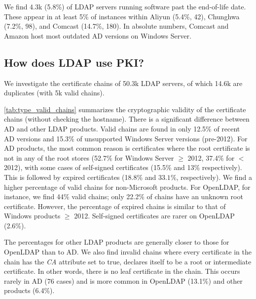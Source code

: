 We find 4.3k (5.8\%) of \gls{LDAP} servers running software past the end-of-life date. These appear in at least 5\% of instances within Aliyun (5.4\%, 42), Chunghwa (7.2\%, 98), and Comcast (14.7\%, 180). In absolute numbers, Comcast and Amazon host most outdated \gls{AD} versions on Windows Server.

\subsection{How does LDAP use PKI?}
We investigate the certificate chains of 50.3k \gls{LDAP} servers, of which 14.6k are duplicates (with 5k valid chains). %


\cref{tab:type_valid_chains} summarizes the cryptographic validity of the certificate chains (without checking the hostname). There is a significant difference between \gls{AD} and other \gls{LDAP} products. Valid chains are found in only 12.5\% of recent \gls{AD} versions and 15.3\% of unsupported Windows Server versions (pre-2012). 
For \gls{AD} products, the most common reason is certificates where the root certificate is not in any of the root stores (52.7\% for Windows Server $\geq$ 2012, 37.4\% for $<$ 2012), with some cases of self-signed certificates (15.5\% and 13\% respectively). This is followed by expired certificates (18.8\% and $33.1\%$, respectively).
We find a higher percentage of valid chains for non-Microsoft products.
For OpenLDAP, for instance, we find 44\% valid chains; only 22.2\% of chains have an unknown root certificate. However, the percentage of expired chains is similar to that of Windows products $\geq$ 2012. Self-signed certificates are rarer on OpenLDAP (2.6\%).

The percentages for other \gls{LDAP} products are generally closer to those for OpenLDAP than to \gls{AD}. We also find invalid chains where every certificate in the chain has the \textit{CA} attribute set to true, \ie declares itself to be a root or intermediate certificate. In other words, there is no leaf certificate in the chain. This occurs rarely in \gls{AD} (76 cases) and is more common in OpenLDAP (13.1\%) and other products (6.4\%).

